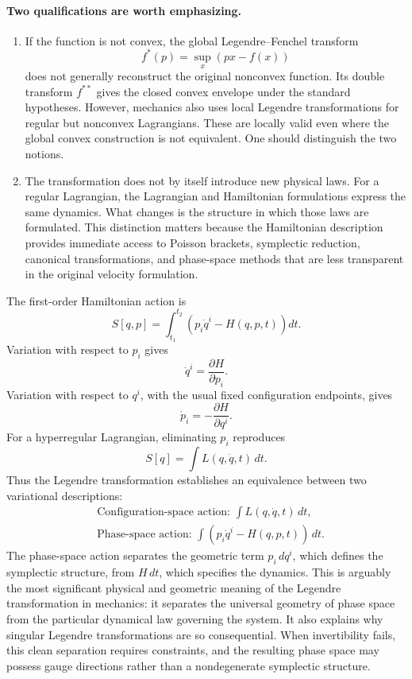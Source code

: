 \paragraph{Two qualifications are worth emphasizing.}
\begin{enumerate}
   \item If the function is not convex, the global Legendre–Fenchel transform
\[
f^*(p)=\sup_x(px-f(x))
\]
does not generally reconstruct the original nonconvex function. Its double
transform \(f^{**}\) gives the closed convex envelope under the standard
hypotheses.
However, mechanics also uses local Legendre transformations for regular but
nonconvex Lagrangians. These are locally valid even where the global convex
construction is not equivalent. One should distinguish the two notions.
   \item The transformation does not by itself introduce new physical laws. For
       a regular Lagrangian, the Lagrangian and Hamiltonian formulations
        express the same dynamics. What changes is the structure in which those
        laws are formulated.
This distinction matters because the Hamiltonian description provides immediate
        access to Poisson brackets, symplectic reduction, canonical
        transformations, and phase-space methods that are less transparent in
        the original velocity formulation.
\end{enumerate}

The first-order Hamiltonian action is
\[
\boxed{
S[q,p]=\int_{t_1}^{t_2}
\left(p_i\dot q^i-H(q,p,t)\right)dt.
}
\]
Variation with respect to \(p_i\) gives
\[
\dot q^i=\frac{\partial H}{\partial p_i}.
\]
Variation with respect to \(q^i\), with the usual fixed configuration
endpoints, gives
\[
\dot p_i=-\frac{\partial H}{\partial q^i}.
\]
For a hyperregular Lagrangian, eliminating \(p_i\) reproduces
\[
S[q]=\int L(q,\dot q,t)\,dt.
\]
Thus the Legendre transformation establishes an equivalence between two
variational descriptions:
\[
\boxed{
\begin{aligned}
&\text{Configuration-space action: }
\int L(q,\dot q,t)\,dt,\\[3pt]
&\text{Phase-space action: }
\int(p_i\dot q^i-H(q,p,t))\,dt.
\end{aligned}
}
\]
The phase-space action separates the geometric term \(p_i\,dq^i\), which
defines the symplectic structure, from \(H\,dt\), which specifies the dynamics.
This is arguably the most significant physical and geometric meaning of the
Legendre transformation in mechanics: it separates the universal geometry of
phase space from the particular dynamical law governing the system.
It also explains why singular Legendre transformations are so consequential.
When invertibility fails, this clean separation requires constraints, and the
resulting phase space may possess gauge directions rather than a nondegenerate
symplectic structure.

